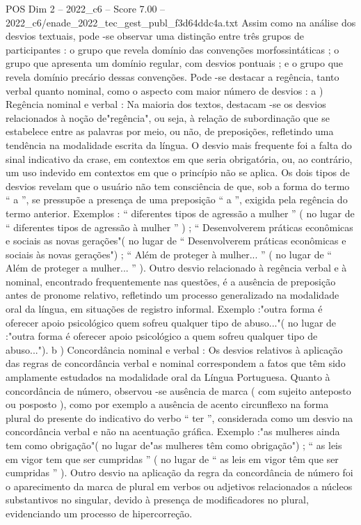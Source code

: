 \begin{textsample}{POS Dim 2 – 2022\_c6 – Score 7.00 – 2022\_c6/enade\_2022\_tec\_gest\_publ\_f3d64ddc4a.txt}
Assim como na análise dos desvios textuais, pode -se observar uma distinção entre três grupos de participantes : o grupo que revela domínio das convenções morfossintáticas ; o grupo que apresenta um domínio regular, com desvios pontuais ; e o grupo que revela domínio precário dessas convenções.
Pode -se destacar a regência, tanto verbal quanto nominal, como o aspecto com maior número de desvios : a ) Regência nominal e verbal : Na maioria dos textos, destacam -se os desvios relacionados à noção de"regência", ou seja, à relação de subordinação que se estabelece entre as palavras por meio, ou não, de preposições, refletindo uma tendência na modalidade escrita da língua.
O desvio mais frequente foi a falta do sinal indicativo da crase, em contextos em que seria obrigatória, ou, ao contrário, um uso indevido em contextos em que o princípio não se aplica.
Os dois tipos de desvios revelam que o usuário não tem consciência de que, sob a forma do termo “ a ”, se pressupõe a presença de uma preposição “ a ”, exigida pela regência do termo anterior.
Exemplos : “ diferentes tipos de agressão a mulher ” ( no lugar de “ diferentes tipos de agressão à mulher ” ) ; “ Desenvolverem práticas econômicas e sociais as novas gerações"( no lugar de “ Desenvolverem práticas econômicas e sociais às novas gerações") ; “ Além de proteger à mulher... ” ( no lugar de “ Além de proteger a mulher... ” ).
Outro desvio relacionado à regência verbal e à nominal, encontrado frequentemente nas questões, é a ausência de preposição antes de pronome relativo, refletindo um processo generalizado na modalidade oral da língua, em situações de registro informal.
Exemplo :"outra forma é oferecer apoio psicológico quem sofreu qualquer tipo de abuso..."( no lugar de :"outra forma é oferecer apoio psicológico a quem sofreu qualquer tipo de abuso..."). b ) Concordância nominal e verbal : Os desvios relativos à aplicação das regras de concordância verbal e nominal correspondem a fatos que têm sido amplamente estudados na modalidade oral da Língua Portuguesa.
Quanto à concordância de número, observou -se ausência de marca ( com sujeito anteposto ou posposto ), como por exemplo a ausência de acento circunflexo na forma plural do presente do indicativo do verbo “ ter ”, considerada como um desvio na concordância verbal e não na acentuação gráfica.
Exemplo :"as mulheres ainda tem como obrigação"( no lugar de"as mulheres têm como obrigação") ; “ as leis em vigor tem que ser cumpridas ” ( no lugar de “ as leis em vigor têm que ser cumpridas ” ).
Outro desvio na aplicação da regra da concordância de número foi o aparecimento da marca de plural em verbos ou adjetivos relacionados a núcleos substantivos no singular, devido à presença de modificadores no plural, evidenciando um processo de hipercorreção.

\end{textsample}

